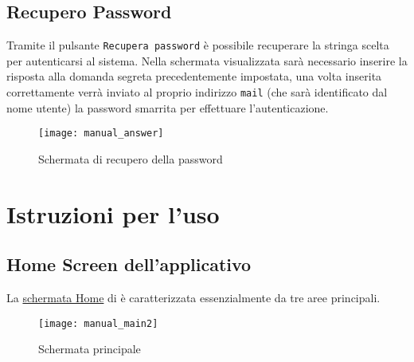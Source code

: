 \subsection{Recupero Password}
Tramite il pulsante \texttt{Recupera password} è possibile recuperare la stringa scelta per autenticarsi al sistema. Nella schermata visualizzata sarà necessario inserire la risposta alla domanda segreta precedentemente impostata, una volta inserita correttamente verrà inviato al proprio indirizzo \texttt{mail} (che sarà identificato dal nome utente) la password smarrita per effettuare l'autenticazione.

\begin{figure}[H]
  \texttt{[image: manual\_answer]}
\caption{Schermata di recupero della password}\label{fig:answer}
\end{figure}


\section{Istruzioni per l'uso}
\subsection{Home Screen dell'applicativo }
La \underline{schermata Home} di \caName{} è caratterizzata essenzialmente da tre aree principali.

\begin{figure}[H]
  \texttt{[image: manual\_main2]}
\caption{Schermata principale}\label{fig:main}
\end{figure}


